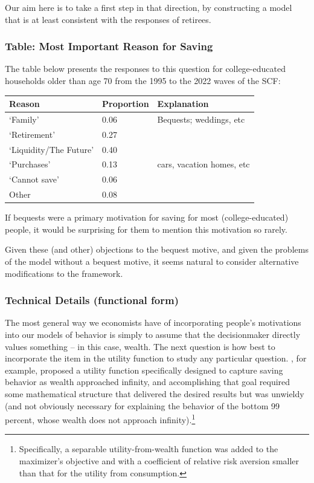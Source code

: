 \documentclass{article}
\begin{document}
Our aim here is to take a first step in that direction, by constructing a model that is at least consistent with the responses of retirees.

\subsubsection{Table: Most Important Reason for Saving}\label{most-important-reason}

The table below presents the responses to this question for college-educated households older than age 70 from the 1995 to the 2022 waves of the SCF:

\newline
\bigskip\noindent
\begin{tabular}{p{}p{}p{}}
\toprule
Reason & Proportion & Explanation \\
\hline
`Family' & 0.06 & Bequests; weddings, etc \\
`Retirement' & 0.27 &  \\
`Liquidity/The Future' & 0.40 &  \\
`Purchases' & 0.13 & cars, vacation homes, etc \\
`Cannot save' & 0.06 &  \\
Other & 0.08 &  \\
\bottomrule
\end{tabular}

\bigskip\newline
If bequests were a primary motivation for saving for most (college-educated) people, it would be surprising for them to mention this motivation so rarely.

Given these (and other) objections to the bequest motive, and given the problems of the model without a bequest motive, it seems natural to consider alternative modifications to the framework.

\subsubsection{Technical Details (functional form)}

The most general way we economists have of incorporating people's motivations into our models of behavior is simply to assume that the decisionmaker directly values something -- in this case, wealth. The next question is how best to incorporate the item in the utility function to study any particular question.  \cite{WhyDoTheRich}, for example, proposed a utility function specifically designed to capture saving behavior as wealth approached infinity, and accomplishing that goal required some mathematical structure that delivered the desired results but was unwieldy (and not obviously necessary for explaining the behavior of the bottom 99 percent, whose wealth does not approach infinity).\footnote{Specifically, a separable utility-from-wealth function was added to the maximizer's objective and with a coefficient of relative risk aversion smaller than that for the utility from consumption.}
\end{document}
